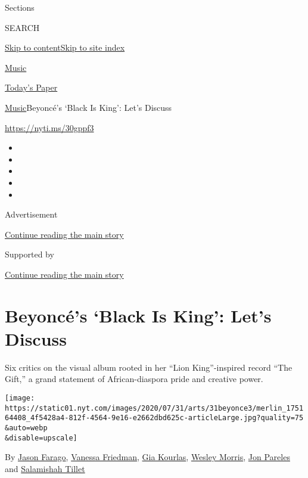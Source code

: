 Sections

SEARCH

\protect\hyperlink{site-content}{Skip to
content}\protect\hyperlink{site-index}{Skip to site index}

\href{https://www.nytimes.com/section/arts/music}{Music}

\href{https://myaccount.nytimes.com/auth/login?response_type=cookie\&client_id=vi}{}

\href{https://www.nytimes.com/section/todayspaper}{Today's Paper}

\href{/section/arts/music}{Music}\textbar{}Beyoncé's `Black Is King':
Let's Discuss

\url{https://nyti.ms/30gppf3}

\begin{itemize}
\item
\item
\item
\item
\item
\end{itemize}

Advertisement

\protect\hyperlink{after-top}{Continue reading the main story}

Supported by

\protect\hyperlink{after-sponsor}{Continue reading the main story}

\hypertarget{beyoncuxe9s-black-is-king-lets-discuss}{%
\section{Beyoncé's `Black Is King': Let's
Discuss}\label{beyoncuxe9s-black-is-king-lets-discuss}}

Six critics on the visual album rooted in her ``Lion King''-inspired
record ``The Gift,'' a grand statement of African-diaspora pride and
creative power.

\texttt{[image: https://static01.nyt.com/images/2020/07/31/arts/31beyonce3/merlin\_175164408\_4f5428a4-812f-4564-9e16-e2662dbd625c-articleLarge.jpg?quality=75\\\&auto=webp\\\&disable=upscale]}

By \href{https://www.nytimes.com/by/jason-farago}{Jason Farago},
\href{https://www.nytimes.com/by/vanessa-friedman}{Vanessa Friedman},
\href{https://www.nytimes.com/by/gia-kourlas}{Gia Kourlas},
\href{https://www.nytimes.com/by/wesley-morris}{Wesley Morris},
\href{https://www.nytimes.com/by/jon-pareles}{Jon Pareles} and
\href{https://www.nytimes.com/by/salamishah-tillet}{Salamishah Tillet}

